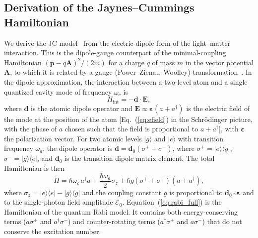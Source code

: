 \documentclass[%
 reprint,
 amsmath,amssymb,
 aps,
 floatfix,
]{revtex4-2}
\begin{document}
\subsection{Derivation of the Jaynes--Cummings Hamiltonian}
\label{sec:jcm}

We derive the JC model~\cite{jaynes1963} from the electric-dipole form of the light--matter interaction. This is the dipole-gauge counterpart of the minimal-coupling Hamiltonian $(\bm{p} - q\bm{A})^2/(2m)$ for a charge $q$ of mass $m$ in the vector potential $\bm{A}$, to which it is related by a gauge (Power--Zienau--Woolley) transformation~\cite{scully1997}. In the dipole approximation, the interaction between a two-level atom and a single quantized cavity mode of frequency $\omega_c$ is
\begin{equation}
H_{\text{int}} = -\bm{d} \cdot \bm{E},
\end{equation}
where $\bm{d}$ is the atomic dipole operator and $\bm{E} \propto \bm{\varepsilon}(a + a^\dagger)$ is the electric field of the mode at the position of the atom [Eq.~(\ref{eq:efield}) in the Schr\"{o}dinger picture, with the phase of $a$ chosen such that the field is proportional to $a + a^\dagger$], with $\bm{\varepsilon}$ the polarization vector. For two atomic levels $|g\rangle$ and $|e\rangle$ with transition frequency $\omega_a$, the dipole operator is $\bm{d} = \bm{d}_0(\sigma^+ + \sigma^-)$, where $\sigma^+ = |e\rangle\langle g|$, $\sigma^- = |g\rangle\langle e|$, and $\bm{d}_0$ is the transition dipole matrix element. The total Hamiltonian is then
\begin{equation}
H = \hbar\omega_c\, a^\dagger a + \frac{\hbar\omega_a}{2}\sigma_z + \hbar g(\sigma^+ + \sigma^-)(a + a^\dagger),
\label{eq:rabi_full}
\end{equation}
where $\sigma_z = |e\rangle\langle e| - |g\rangle\langle g|$ and the coupling constant $g$ is proportional to $\bm{d}_0 \cdot \bm{\varepsilon}$ and to the single-photon field amplitude $\mathcal{E}_0$. Equation~(\ref{eq:rabi_full}) is the Hamiltonian of the quantum Rabi model. It contains both energy-conserving terms ($a\sigma^+$ and $a^\dagger\sigma^-$) and counter-rotating terms ($a^\dagger\sigma^+$ and $a\sigma^-$) that do not conserve the excitation number.
\end{document}
